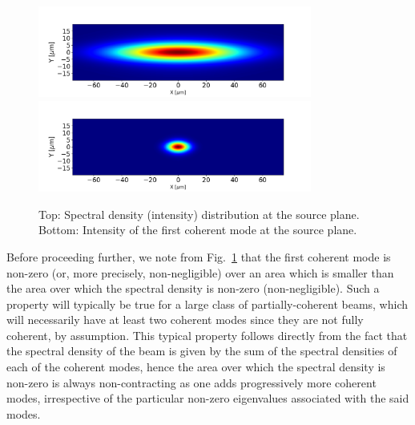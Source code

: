 \documentclass{iucr}              %
\newcommand{\inblue}[1]{{\color{blue}#1}}
\begin{document}
\begin{figure}\label{spectral_density}%
\caption{Top: Spectral density (intensity) distribution at the source plane. Bottom: Intensity of the first coherent mode at the source plane.}
\includegraphics[width=9.0cm]{Figures/spectral_density_upto1099.png}
\includegraphics[width=9.0cm]{Figures/spectral_density_upto0.png}
\end{figure}

Before proceeding further, we note from \inblue{Fig.~\ref{spectral_density}} that the first coherent mode is non-zero (or, more precisely, non-negligible) over an area which is smaller than the area over which the spectral density is non-zero (non-negligible). Such a property will typically be true for a large class of partially-coherent beams, which will necessarily have at least two coherent modes since they are not fully coherent, by assumption.  This typical property follows directly from the fact that the spectral density of the beam is given by the sum of the spectral densities of each of the coherent modes, hence the area over which the spectral density is non-zero is always non-contracting as one adds progressively more coherent modes, irrespective of the particular non-zero eigenvalues associated with the said modes.  
\end{document}
